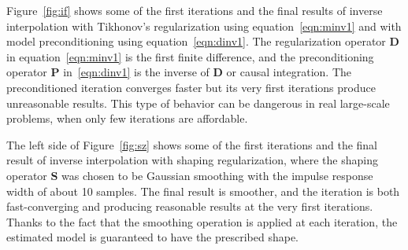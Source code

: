 Figure~\ref{fig:if} shows some of the first iterations and the final
results of inverse interpolation with Tikhonov's regularization
using equation~\ref{eqn:minv1} and with model preconditioning
using equation~\ref{eqn:dinv1}. The regularization operator
$\mathbf{D}$ in equation~\ref{eqn:minv1} is the first finite
difference, and the preconditioning operator $\mathbf{P}$
in~\ref{eqn:dinv1} is the inverse of $\mathbf{D}$ or causal
integration.  The preconditioned iteration converges faster but its
very first iterations produce unreasonable results. This type of
behavior can be dangerous in real large-scale problems, when only few
iterations are affordable.




The left side of Figure~\ref{fig:sz} shows some of the first
iterations and the final result of inverse interpolation with shaping
regularization, where the shaping operator $\mathbf{S}$ was chosen to
be Gaussian smoothing with the impulse response width of about 10
samples. The final result is smoother, and the iteration is both
fast-converging and producing reasonable results at the very first
iterations. Thanks to the fact that the smoothing operation is
applied at each iteration, the estimated model is 
guaranteed to have the prescribed shape.

